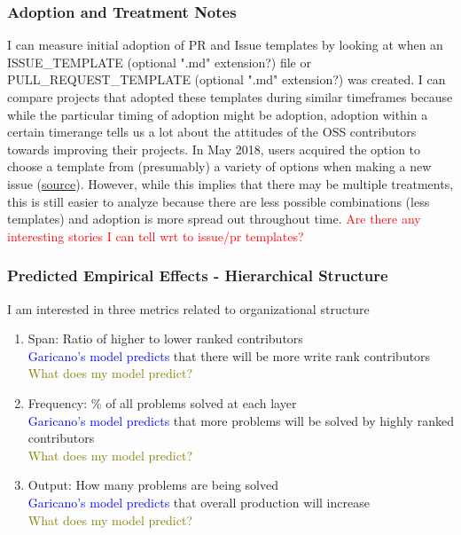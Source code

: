 \documentclass[source/paper/main.tex]{subfiles}
\begin{document}
\subsubsection{Adoption and Treatment Notes}
I can measure initial adoption of PR and Issue templates by looking at when an ISSUE\_TEMPLATE (optional ".md" extension?) file or PULL\_REQUEST\_TEMPLATE (optional ".md" extension?) was created. I can compare projects that adopted these templates during similar timeframes because while the particular timing of adoption might be adoption, adoption within a certain timerange tells us a lot about the attitudes of the OSS contributors towards improving their projects. In May 2018, users acquired the option to choose a template from (presumably) a variety of options when making a new issue (\href{https://github.blog/changelog/2018-05-02-mutiple-template-choice/}{source}). However, while this implies that there may be multiple treatments, this is still easier to analyze because there are less possible combinations (less templates) and adoption is more spread out throughout time. 
\textcolor{red}{Are there any interesting stories I can tell wrt to issue/pr templates? }

\subsubsection{Predicted Empirical Effects - Hierarchical Structure}
I am interested in three metrics related to organizational structure
\begin{enumerate}
    \item Span: Ratio of higher to lower ranked contributors \\
    \textcolor{blue}{Garicano's model predicts} that there will be more write rank contributors\\
    \textcolor{olive}{What does my model predict?}
    \item Frequency: \% of all problems solved at each layer\\
    \textcolor{blue}{Garicano's model predicts} that more problems will be solved by highly ranked contributors \\
    \textcolor{olive}{What does my model predict?}
    \item Output: How many problems are being solved\\
    \textcolor{blue}{Garicano's model predicts} that overall production will increase \\
    \textcolor{olive}{What does my model predict?}
\end{enumerate}
\end{document}
